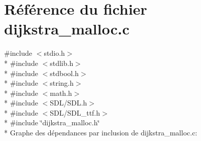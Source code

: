 \section{Référence du fichier dijkstra\+\_\+malloc.\+c}
\label{dijkstra__malloc_8c}
{\ttfamily \#include $<$stdio.\+h$>$}\\*
{\ttfamily \#include $<$stdlib.\+h$>$}\\*
{\ttfamily \#include $<$stdbool.\+h$>$}\\*
{\ttfamily \#include $<$string.\+h$>$}\\*
{\ttfamily \#include $<$math.\+h$>$}\\*
{\ttfamily \#include $<$S\+D\+L/\+S\+D\+L.\+h$>$}\\*
{\ttfamily \#include $<$S\+D\+L/\+S\+D\+L\+\_\+ttf.\+h$>$}\\*
{\ttfamily \#include \char`\"{}dijkstra\+\_\+malloc.\+h\char`\"{}}\\*
Graphe des dépendances par inclusion de dijkstra\+\_\+malloc.\+c\+:
